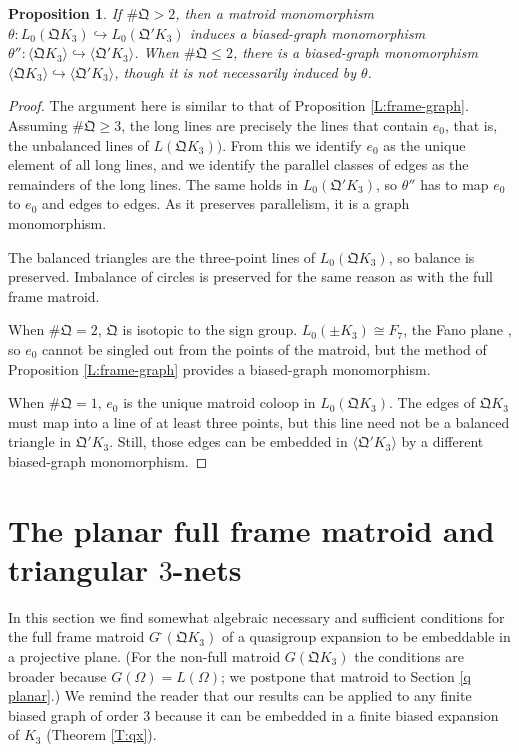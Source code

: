 \documentclass[reqno,12pt]{amsart}
\newtheorem{prop}[thm]{Proposition}
\theoremstyle{remark}
\numberwithin{equation}{section}
\numberwithin{figure}{section}
\newcommand\embeds{\hookrightarrow}
\newcommand \bgr[1]{\langle#1\rangle}
\newcommand \full{^{{}^{{}_{{}_\bullet}}\!}}
\newcommand \fQ{\mathfrak Q}
\newcommand\G{{G\full}}
\begin{document}
\begin{prop}\label{L:lift-graph}
If $\#\fQ > 2$, then a matroid monomorphism $\theta: L_0(\fQ K_3) \embeds L_0(\fQ' K_3)$ induces a biased-graph monomorphism $\theta'': \bgr{\fQ K_3} \embeds \bgr{\fQ' K_3}$.  When $\#\fQ \leq 2$, there is a biased-graph monomorphism $\bgr{\fQ K_3} \embeds \bgr{\fQ' K_3}$, though it is not necessarily induced by $\theta$.
\end{prop}

\begin{proof}
The argument here is similar to that of Proposition \ref{L:frame-graph}.  
Assuming $\#\fQ \geq 3$, the long lines are precisely the lines that contain $e_0$, that is, the unbalanced lines of $L(\fQ K_3))$.  From this we identify $e_0$ as the unique element of all long lines, and we identify the parallel classes of edges as the remainders of the long lines.  The same holds in $L_0(\fQ' K_3)$, so $\theta''$ has to map $e_0$ to $e_0$ and edges to edges.  As it preserves parallelism, it is a graph monomorphism.  

The balanced triangles are the three-point lines of $L_0(\fQ K_3)$, so balance is preserved.  Imbalance of circles is preserved for the same reason as with the full frame matroid.

When $\#\fQ = 2$, $\fQ$ is isotopic to the sign group.  $L_0(\pm K_3) \cong F_7$, the Fano plane \cite{SBM}, so $e_0$ cannot be singled out from the points of the matroid, but the method of Proposition \ref{L:frame-graph} provides a biased-graph monomorphism.

When $\#\fQ = 1$, $e_0$ is the unique matroid coloop in $L_0(\fQ K_3)$.  The edges of $\fQ K_3$ must map into a line of at least three points, but this line need not be a balanced triangle in $\fQ' K_3$.  Still, those edges can be embedded in $\bgr{\fQ' K_3}$ by a different biased-graph monomorphism.
\end{proof}




\section{The planar full frame matroid and triangular $3$-nets}\label{q frame}

In this section we find somewhat algebraic necessary and sufficient conditions for the full frame matroid $\G(\fQ K_3)$ of a quasigroup expansion to be embeddable in a projective plane.  (For the non-full matroid $G(\fQ K_3)$ the conditions are broader because $G(\Omega)=L(\Omega)$; we postpone that matroid to Section \ref{q planar}.)  
We remind the reader that our results can be applied to any finite biased graph of order 3 because it can be embedded in a finite biased expansion of $K_3$ (Theorem \ref{T:qx}).  
\end{document}
